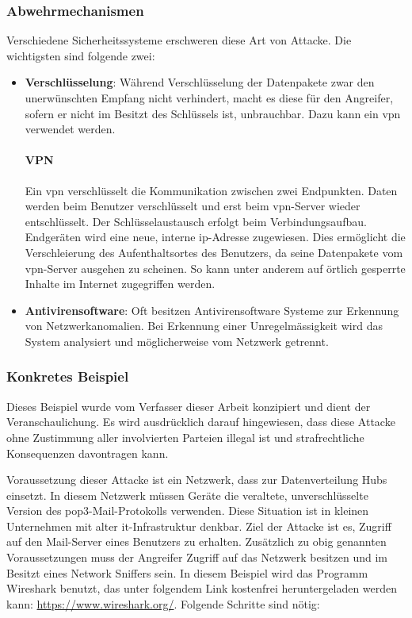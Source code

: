 \documentclass[11pt, a4paper]{article}
\begin{document}
\subsubsection{Abwehrmechanismen}
Verschiedene Sicherheitssysteme erschweren diese Art von Attacke. Die wichtigsten sind folgende zwei:
\begin{itemize}
	\item \textbf{Verschlüsselung}: Während Verschlüsselung der Datenpakete zwar den unerwünschten Empfang nicht verhindert, macht es diese für den Angreifer, sofern er nicht im Besitzt des Schlüssels ist, unbrauchbar. Dazu kann ein \gls{vpn} verwendet werden.
	\paragraph{VPN}
	Ein \gls{vpn} verschlüsselt die Kommunikation zwischen zwei Endpunkten. Daten werden beim Benutzer verschlüsselt und erst beim \gls{vpn}-Server wieder entschlüsselt. Der Schlüsselaustausch erfolgt beim Verbindungsaufbau. Endgeräten wird eine neue, interne \gls{ip}-Adresse zugewiesen. Dies ermöglicht die Verschleierung des Aufenthaltsortes des Benutzers, da seine Datenpakete vom \gls{vpn}-Server ausgehen zu scheinen. So kann unter anderem auf örtlich gesperrte Inhalte im Internet zugegriffen werden.~\cite{BSIWasis:online}
	\item \textbf{Antivirensoftware}: Oft besitzen Antivirensoftware Systeme zur Erkennung von Netzwerkanomalien. Bei Erkennung einer Unregelmässigkeit wird das System analysiert und möglicherweise vom Netzwerk getrennt.
\end{itemize}
\subsubsection{Konkretes Beispiel}
Dieses Beispiel wurde vom Verfasser dieser Arbeit konzipiert und dient der Veranschaulichung. Es wird ausdrücklich darauf hingewiesen, dass diese Attacke ohne Zustimmung aller involvierten Parteien illegal ist und strafrechtliche Konsequenzen davontragen kann.

Voraussetzung dieser Attacke ist ein Netzwerk, dass zur Datenverteilung Hubs einsetzt. In diesem Netzwerk müssen Geräte die veraltete, unverschlüsselte Version des \gls{pop3}-Mail-Protokolls verwenden. Diese Situation ist in kleinen Unternehmen mit alter \gls{it}-Infrastruktur denkbar.  Ziel der Attacke ist es, Zugriff auf den Mail-Server eines Benutzers zu erhalten. Zusätzlich zu obig genannten Voraussetzungen muss der Angreifer Zugriff auf das Netzwerk besitzen und im Besitzt eines Network Sniffers sein. In diesem Beispiel wird das Programm Wireshark benutzt, das unter folgendem Link kostenfrei heruntergeladen werden kann: \url{https://www.wireshark.org/}. Folgende Schritte sind nötig:
\end{document}
